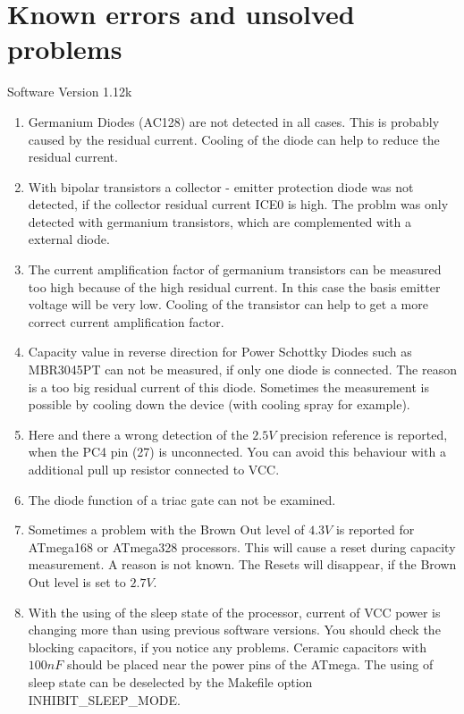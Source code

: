 
\chapter{Known errors and unsolved problems}
{\center Software Version 1.12k}

\begin{enumerate}

\item Germanium Diodes (AC128) are not detected in all cases. This is probably caused by the residual current.
Cooling of the diode can help to reduce the residual current.

\item With bipolar transistors a collector - emitter protection diode was not detected, if the
collector residual current ICE0 is high. 
The problm was only detected with germanium transistors, which are complemented with a external diode.

\item The current amplification factor of germanium transistors can be measured too high because of
the high residual current. In this case the basis emitter voltage will be very low.
Cooling of the transistor can help to get a more correct current amplification factor.

\item Capacity value in reverse direction for Power Schottky Diodes such as MBR3045PT can not be measured,
if only one diode is connected. The reason is a too big residual current of this diode.
Sometimes the measurement is possible by cooling down the device (with  cooling spray for example).

\item Here and there  a wrong detection of the \(2.5V\) precision reference is reported, when the PC4 pin (27) is unconnected.
You can avoid this behaviour with a additional pull up resistor connected to VCC.

\item The diode function of a triac gate can not be examined.

\item Sometimes a problem with the Brown Out level of \(4.3V\) is reported for ATmega168 or ATmega328 processors.
This will cause a reset during capacity measurement. A reason is not known.
The Resets will disappear, if the Brown Out level is set to \(2.7V\).

\item With the using of the sleep state of the processor, current of VCC power is changing more than 
using previous software versions.
You should check the blocking capacitors, if you notice any problems.
Ceramic capacitors with \(100nF\) should be placed near the power pins of the ATmega. 
The using of sleep state can be deselected by the Makefile option INHIBIT\_SLEEP\_MODE.


\end{enumerate}
